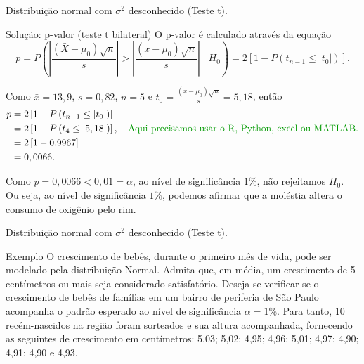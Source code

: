 \documentclass[8pt]{beamer}
\begin{document}
\begin{frame}{Distribuição normal com $\sigma^2$ desconhecido (Teste t).}

\begin{block}{Solução: p-valor (teste t bilateral)}
	O p-valor é calculado através da equação
	$$p=P\left( \left\lvert \frac{(\bar{X} - \mu_0)\sqrt{n}}{s} \right\rvert >  \left\lvert \frac{(\bar{x} - \mu_0)\sqrt{n}}{s}  \right\rvert \mid H_0 \right) = 2 \left[ 1 - P\left( t_{n-1} \leq \lvert t_0 \rvert \right) \right].$$
	
	Como $\bar{x} = 13,9$, $s=0,82$, $n=5$ e $t_0 = \frac{(\bar{x} -\mu_0)\sqrt{n}}{s} = 5,18$, então
	\begin{align*}
		p &= 2 \left[ 1 - P\left( t_{n-1} \leq \lvert t_0 \rvert \right) \right]\\
		&= 2 \left[ 1 - P\left( t_{4} \leq \lvert 5,18 \rvert \right) \right], \quad \mbox{\textcolor{important}{Aqui precisamos usar o R, Python, excel ou MATLAB.}} \\
		&= 2 \left[ 1- 0.9967 \right]\\
		&= 0,0066.
	\end{align*}
	
	Como $p=0,0066 < 0,01 = \alpha$, ao nível de significância $1\%$, não rejeitamos $H_0$. Ou seja, ao nível de significância $1\%$, podemos afirmar que a moléstia altera o consumo de oxigênio pelo rim.
\end{block}

\end{frame}

\begin{frame}{Distribuição normal com $\sigma^2$ desconhecido (Teste t).}

\large
 \begin{block}{Exemplo}
	O crescimento de bebês, durante o primeiro mês de vida, pode ser modelado pela distribuição Normal. Admita que, em média, um crescimento de 5 centímetros ou mais seja considerado satisfatório. Deseja-se verificar se o crescimento de bebês de famílias em um bairro de periferia de São Paulo acompanha o padrão esperado ao nível de significância $\alpha=1\%$. Para tanto, 10 recém-nascidos na região foram sorteados e sua altura acompanhada, fornecendo as seguintes de crescimento em centímetros: 5,03; 5,02; 4,95; 4,96; 5,01; 4,97; 4,90; 4,91; 4,90 e 4,93.
\end{block}


\normalsize

\end{frame}
\end{document}
